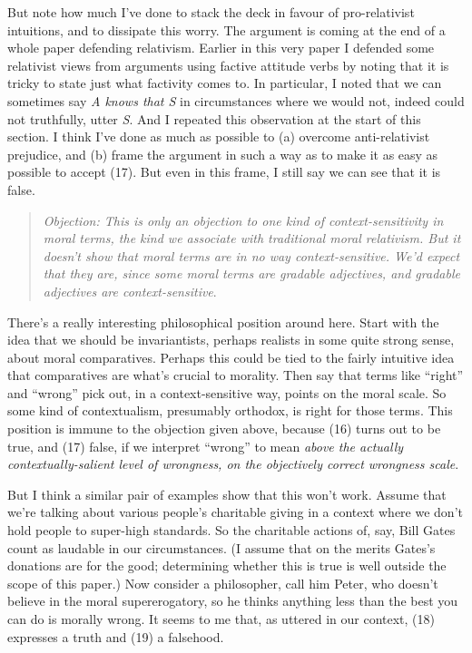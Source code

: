 \documentclass[
  11pt,
  letterpaper,
  DIV=11,
  numbers=noendperiod,
  twoside]{scrartcl}
\begin{document}
But note how much I've done to stack the deck in favour of
pro-relativist intuitions, and to dissipate this worry. The argument is
coming at the end of a whole paper defending relativism. Earlier in this
very paper I defended some relativist views from arguments using factive
attitude verbs by noting that it is tricky to state just what factivity
comes to. In particular, I noted that we can sometimes say \emph{A knows
that S} in circumstances where we would not, indeed could not
truthfully, utter \emph{S}. And I repeated this observation at the start
of this section. I think I've done as much as possible to (a) overcome
anti-relativist prejudice, and (b) frame the argument in such a way as
to make it as easy as possible to accept (17). But even in this frame, I
still say we can see that it is false.

\begin{quote}
\emph{Objection: This is only an objection to one kind of
context-sensitivity in moral terms, the kind we associate with
traditional moral relativism. But it doesn't show that moral terms are
in no way context-sensitive. We'd expect that they are, since some moral
terms are gradable adjectives, and gradable adjectives are
context-sensitive}.
\end{quote}

There's a really interesting philosophical position around here. Start
with the idea that we should be invariantists, perhaps realists in some
quite strong sense, about moral comparatives. Perhaps this could be tied
to the fairly intuitive idea that comparatives are what's crucial to
morality. Then say that terms like ``right'' and ``wrong'' pick out, in
a context-sensitive way, points on the moral scale. So some kind of
contextualism, presumably orthodox, is right for those terms. This
position is immune to the objection given above, because (16) turns out
to be true, and (17) false, if we interpret ``wrong'' to mean
\emph{above the actually contextually-salient level of wrongness, on the
objectively correct wrongness scale}.

But I think a similar pair of examples show that this won't work. Assume
that we're talking about various people's charitable giving in a context
where we don't hold people to super-high standards. So the charitable
actions of, say, Bill Gates count as laudable in our circumstances. (I
assume that on the merits Gates's donations are for the good;
determining whether this is true is well outside the scope of this
paper.) Now consider a philosopher, call him Peter, who doesn't believe
in the moral supererogatory, so he thinks anything less than the best
you can do is morally wrong. It seems to me that, as uttered in our
context, (18) expresses a truth and (19) a falsehood.
\end{document}
